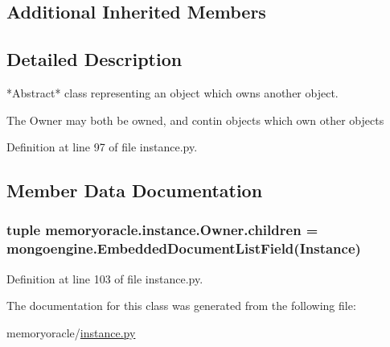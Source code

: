 \subsection*{Additional Inherited Members}


\subsection{Detailed Description}
\begin{DoxyVerb}*Abstract* class representing an object which owns another object.

The Owner may both be owned, and contin objects which own other objects
\end{DoxyVerb}
 

Definition at line 97 of file instance.\+py.



\subsection{Member Data Documentation}
\hypertarget{classmemoryoracle_1_1instance_1_1Owner_a412932bf9f72a82d00452a2944e120de}{}
\subsubsection[{children}]{\setlength{\rightskip}{0pt plus 5cm}tuple memoryoracle.\+instance.\+Owner.\+children = mongoengine.\+Embedded\+Document\+List\+Field({\bf Instance})\hspace{0.3cm}{\ttfamily [static]}}\label{classmemoryoracle_1_1instance_1_1Owner_a412932bf9f72a82d00452a2944e120de}


Definition at line 103 of file instance.\+py.



The documentation for this class was generated from the following file\+:\begin{DoxyCompactItemize}
\item 
memoryoracle/\hyperlink{instance_8py}{instance.\+py}\end{DoxyCompactItemize}
